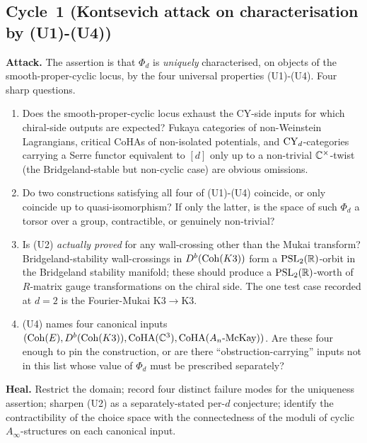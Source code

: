 \subsection*{Cycle~1 (Kontsevich attack on characterisation by (U1)-(U4))}

\textbf{Attack.} The assertion is that $\Phi_d$ is \emph{uniquely}
characterised, on objects of the smooth-proper-cyclic locus, by the
four universal properties (U1)-(U4). Four sharp questions.
\begin{enumerate}
\item[Q1.] Does the smooth-proper-cyclic locus exhaust the CY-side
inputs for which chiral-side outputs are expected? Fukaya categories of
non-Weinstein Lagrangians, critical CoHAs of non-isolated potentials,
and $\mathrm{CY}_d$-categories carrying a Serre functor equivalent to $[d]$
only up to a non-trivial $\mathbb{C}^\times$-twist (the Bridgeland-stable
but non-cyclic case) are obvious omissions.
\item[Q2.] Do two constructions satisfying all four of (U1)-(U4)
coincide, or only coincide up to quasi-isomorphism? If only the latter,
is the space of such $\Phi_d$ a torsor over a group, contractible, or
genuinely non-trivial?
\item[Q3.] Is (U2) \emph{actually proved} for any wall-crossing other
than the Mukai transform? Bridgeland-stability wall-crossings in
$D^b(\mathrm{Coh}(K3))$ form a $\mathrm{PSL}_2(\mathbb{R})$-orbit in the Bridgeland
stability manifold; these should produce a $\mathrm{PSL}_2(\mathbb{R})$-worth
of $R$-matrix gauge transformations on the chiral side. The one test
case recorded at $d = 2$ is the Fourier-Mukai $\mathrm{K3} \to \mathrm{K3}$.
\item[Q4.] (U4) names four canonical inputs
$(\mathrm{Coh}(E), D^b(\mathrm{Coh}(K3)), \mathrm{CoHA}(\mathbb{C}^3), \mathrm{CoHA}(A_n\text{-McKay}))$.
Are these four enough to pin the construction, or are there
``obstruction-carrying'' inputs not in this list whose value of
$\Phi_d$ must be prescribed separately?
\end{enumerate}

\textbf{Heal.} Restrict the domain; record four distinct failure modes
for the uniqueness assertion; sharpen (U2) as a separately-stated
per-$d$ conjecture; identify the contractibility of the choice space
with the connectedness of the moduli of cyclic $A_\infty$-structures
on each canonical input.

